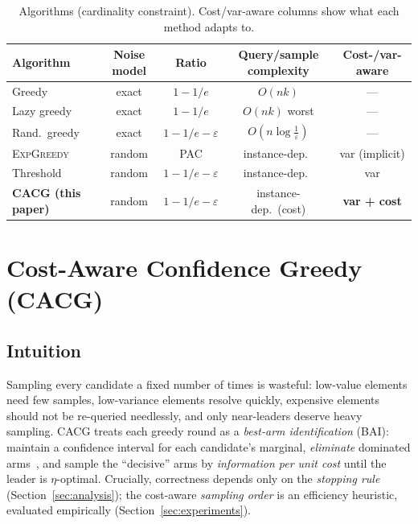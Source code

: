 \documentclass[11pt]{article}
\theoremstyle{plain}
\theoremstyle{definition}
\begin{document}
\begin{table}[H]
\centering\small
\caption{Algorithms (cardinality constraint). Cost/var-aware columns show
what each method adapts to.}\label{tab:algos}
\begin{tabular}{lcccc}
\toprule
Algorithm & Noise model & Ratio & Query/sample complexity & Cost-/var-aware\\
\midrule
Greedy~\cite{NWF1978}            & exact       & $1-1/e$ & $O(nk)$              & ---\\
Lazy greedy~\cite{Minoux1978}    & exact       & $1-1/e$ & $O(nk)$ worst         & ---\\
Rand.\ greedy~\cite{Mirzasoleiman2015} & exact & $1-1/e-\varepsilon$ & $O(n\log\tfrac1\varepsilon)$ & ---\\
\textsc{ExpGreedy}~\cite{Singla2016} & random & PAC & instance-dep.\ & var (implicit)\\
Threshold~\cite{ChenXingCrawford2023} & random & $1-1/e-\varepsilon$ & instance-dep.\ & var\\
\textbf{CACG (this paper)}       & random      & $1-1/e-\varepsilon$ & instance-dep.\ (cost) & \textbf{var + cost}\\
\bottomrule
\end{tabular}
\end{table}

\section{Cost-Aware Confidence Greedy (CACG)}\label{sec:cacg}

\subsection{Intuition}
Sampling every candidate a fixed number of times is wasteful: low-value
elements need few samples, low-variance elements resolve quickly, expensive
elements should not be re-queried needlessly, and only near-leaders deserve
heavy sampling. CACG treats each greedy round as a \emph{best-arm
identification} (BAI): maintain a confidence interval for each candidate's
marginal, \emph{eliminate} dominated arms~\cite{EvenDar2006}, and sample the
``decisive'' arms by \emph{information per unit cost} until the leader is
$\eta$-optimal.
Crucially, correctness depends only on the \emph{stopping rule}
(Section~\ref{sec:analysis}); the cost-aware \emph{sampling order} is an
efficiency heuristic, evaluated empirically (Section~\ref{sec:experiments}).
\end{document}
